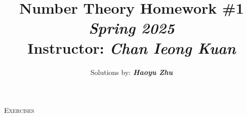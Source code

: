 \documentclass[11pt]{article}
\newcommand\0{\mathbf{0}}
\newcommand\<{\langle}
\renewcommand\>{\rangle}
\begin{document}


\title{\textbf{Number Theory Homework \#1} \textit{Spring 2025}\\\normalsize
	Instructor: \textit{Chan Ieong Kuan}\\[-2ex]}
\author{Solutions by: \textit{\textbf{Haoyu Zhu}}\\[2ex]}
\date{}
\maketitle

\vspace{-5ex}%

\noindent
\textsc{Exercises}%
\end{document}
